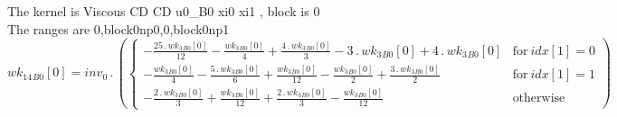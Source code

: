 \documentclass{article}
\begin{document}
\noindent The kernel is Viscous CD CD u0_B0 xi0 xi1 , block is 0\\\noindent The ranges are 0,block0np0,0,block0np1\\\begin{dmath}{wk_{14}{_{B0}}}[{0}] = inv_0 \,.\, \left(\begin{cases} - \frac{25 \,.\, {wk_{3}{_{B0}}}[{0}]}{12} - \frac{{wk_{3}{_{B0}}}[{0}]}{4} + \frac{4 \,.\, {wk_{3}{_{B0}}}[{0}]}{3} - 3 \,.\, {wk_{3}{_{B0}}}[{0}] + 4 \,.\, {wk_{3}{_{B0}}}[{0}] & 
\text{for}\: {idx}[{1}] = 0 \\- \frac{{wk_{3}{_{B0}}}[{0}]}{4} - \frac{5 \,.\, {wk_{3}{_{B0}}}[{0}]}{6} + \frac{{wk_{3}{_{B0}}}[{0}]}{12} - \frac{{wk_{3}{_{B0}}}[{0}]}{2} + \frac{3 \,.\, {wk_{3}{_{B0}}}[{0}]}{2} & \text{for}\: {idx}[{1}] = 1 \\- 
\frac{2 \,.\, {wk_{3}{_{B0}}}[{0}]}{3} + \frac{{wk_{3}{_{B0}}}[{0}]}{12} + \frac{2 \,.\, {wk_{3}{_{B0}}}[{0}]}{3} - \frac{{wk_{3}{_{B0}}}[{0}]}{12} & \text{otherwise} \end{cases}\right)\end{dmath}
\end{document}
